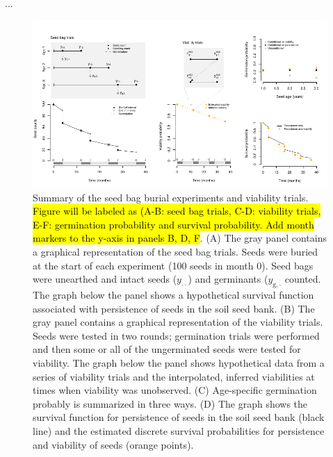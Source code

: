 \documentclass[12pt, oneside, titlepage]{article}   	%
\begin{document}
\begin{singlespace*}...
 \label{tab:datasets} 
\begin{center}

\end{center}
\end{singlespace*} 

\begin{figure}[!h]
       \includegraphics[width=\textwidth]{../manuscript/figures/seed-bag-figure.pdf}  
    \caption{ Summary of the seed bag burial experiments and viability trials. \hl{Figure will be labeled as (A-B: seed bag trials, C-D: viability trials, E-F: germination probability and survival probability. Add month markers to the y-axis in panels B, D, F}. (A) The gray panel contains a graphical representation of the seed bag trials. Seeds were buried at the start of each experiment (100 seeds in month 0). Seed bags were unearthed and intact seeds ($y_{\cdot \cdot}$) and germinants ($y_{\mathrm{g},\cdot}$ counted. The graph below the panel shows a hypothetical survival function associated with persistence of seeds in the soil seed bank. (B) The gray panel contains a graphical representation of the viability trials. Seeds were tested in two rounds; germination trials were performed and then some or all of the ungerminated seeds were tested for viability. The graph below the panel shows hypothetical data from a series of viability trials and the interpolated, inferred viabilities at times when viability was unobserved. (C) Age-specific germination probably is summarized in three ways. (D) The graph shows the survival function for persistence of seeds in the soil seed bank (black line) and the estimated discrete survival probabilities for persistence and viability of seeds (orange points). }
 \label{fig:seed-bag-experiments}
\end{figure}
\end{document}
